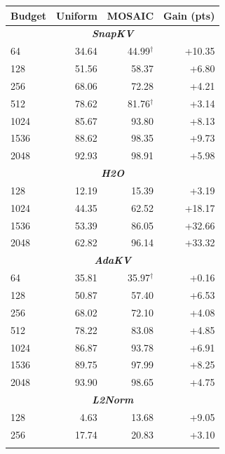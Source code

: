 \documentclass[11pt]{article}
\begin{document}
\begin{table}[t]
  \centering
  \small
  \setlength{\tabcolsep}{16pt}
  \begin{tabular}{@{} l r r r @{}}
    \toprule
    \textbf{Budget} & \textbf{Uniform} & \textbf{MOSAIC} & \textbf{Gain (pts)} \\
    \midrule
    \multicolumn{4}{c}{\textbf{\textit{SnapKV}}} \\
    \midrule
    \rowcolor{gray!10}
    64 & 34.64 & 44.99$^\dagger$ & +10.35 \\
    128 & 51.56 & 58.37 & +6.80 \\
    \rowcolor{gray!10}
    256 & 68.06 & 72.28 & +4.21 \\
    512 & 78.62 & 81.76$^\dagger$ & +3.14 \\
    \rowcolor{gray!10}
    1024 & 85.67 & 93.80 & +8.13 \\
    1536 & 88.62 & 98.35 & +9.73 \\
    \rowcolor{gray!10}
    2048 & 92.93 & 98.91 & +5.98 \\
    \midrule
    \multicolumn{4}{c}{\textbf{\textit{H2O}}} \\
    \midrule
    \rowcolor{gray!10}
    128 & 12.19 & 15.39 & +3.19 \\
    1024 & 44.35 & 62.52 & +18.17 \\
    \rowcolor{gray!10}
    1536 & 53.39 & 86.05 & +32.66 \\
    2048 & 62.82 & 96.14 & +33.32 \\
    \midrule
    \multicolumn{4}{c}{\textbf{\textit{AdaKV}}} \\
    \midrule
    \rowcolor{gray!10}
    64 & 35.81 & 35.97$^\dagger$ & +0.16 \\
    128 & 50.87 & 57.40 & +6.53 \\
    \rowcolor{gray!10}
    256 & 68.02 & 72.10 & +4.08 \\
    512 & 78.22 & 83.08 & +4.85 \\
    \rowcolor{gray!10}
    1024 & 86.87 & 93.78 & +6.91 \\
    1536 & 89.75 & 97.99 & +8.25 \\
    \rowcolor{gray!10}
    2048 & 93.90 & 98.65 & +4.75 \\
    \midrule
    \multicolumn{4}{c}{\textbf{\textit{L2Norm}}} \\
    \midrule
    \rowcolor{gray!10}
    128 & 4.63 & 13.68 & +9.05 \\
    256 & 17.74 & 20.83 & +3.10 \\
    \rowcolor{gray!10}

\end{tabular}
\end{table}
\end{document}
